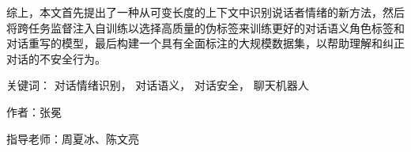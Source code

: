 \begin{cabstract}
\begin{enumerate}
\end{enumerate}
	
	综上，本文首先提出了一种从可变长度的上下文中识别说话者情绪的新方法，然后将跨任务监督注入自训练以选择高质量的伪标签来训练更好的对话语义角色标签和对话重写的模型，最后构建一个具有全面标注的大规模数据集，以帮助理解和纠正对话的不安全行为。
	
	\vskip 21bp
	{\heiti{} 关键词：}
	对话情绪识别，
        对话语义，
        对话安全，
        聊天机器人
	
	\begin{flushright}
		作者：张冕
		
		指导老师：周夏冰、陈文亮
		
	\end{flushright}
\end{cabstract}
